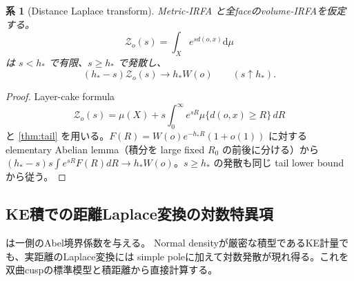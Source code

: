 \documentclass[11pt,a4paper]{ltjsarticle}
\newcommand{\dd}{\mathrm d}
\theoremstyle{plain}
\newtheorem{corollary}[corollary]{系}
\theoremstyle{definition}
\theoremstyle{remark}
\begin{document}
\begin{corollary}[Distance Laplace transform]
\label{cor:Laplace}
Metric-IRFA と全faceのvolume-IRFAを仮定する。
\[
 \mathcal Z_o(s)=\int_X e^{s d(o,x)}\dd\mu
\]
は $s<h_*$ で有限、$s\ge h_*$ で発散し、
\[
 (h_*-s)\mathcal Z_o(s)\longrightarrow h_*W(o)
 \qquad(s\uparrow h_*).
\]
\end{corollary}
\begin{proof}
Layer-cake formula
\[
 \mathcal Z_o(s)=\mu(X)+s\int_0^\infty e^{sR}\mu\{d(o,x)\ge R\}\,dR
\]
と \cref{thm:tail} を用いる。$F(R)=W(o)e^{-h_*R}(1+o(1))$ に対する elementary Abelian lemma（積分を large fixed $R_0$ の前後に分ける）から
$(h_*-s)s\int e^{sR}F(R)dR\to h_*W(o)$。$s\ge h_*$ の発散も同じ tail lower boundから従う。
\end{proof}

\subsection{KE積での距離Laplace変換の対数特異項}
は一側のAbel境界係数を与える。
Normal densityが厳密な積型であるKE計量でも、実距離のLaplace変換には
simple poleに加えて対数発散が現れ得る。これを双曲cuspの標準模型と積距離から直接計算する。
\end{document}
